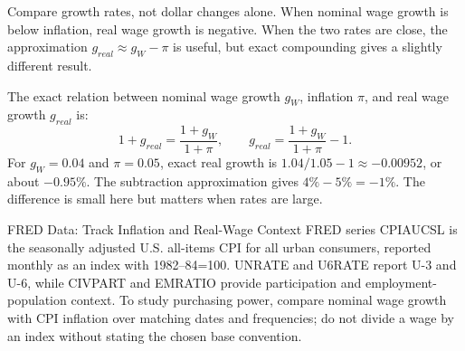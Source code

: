 \documentclass[11pt,letterpaper]{article}
\begin{document}
\begin{tcolorbox}[colback=yellow!10!white,colframe=orange!80!black,title=\textbf{Clear It Up: Nominal Raise Does Not Guarantee a Real Raise}]
Compare growth rates, not dollar changes alone. When nominal wage growth is below inflation, real wage growth is negative. When the two rates are close, the approximation $g_{real}\approx g_W-\pi$ is useful, but exact compounding gives a slightly different result.
\end{tcolorbox}

\begin{tcolorbox}[colback=blue!5!white,colframe=blue!60!black,title=\textbf{Optional Advanced: Exact Real-Wage Growth Identity}]
\small
The exact relation between nominal wage growth $g_W$, inflation $\pi$, and real wage growth $g_{real}$ is:
\[
1+g_{real}=\frac{1+g_W}{1+\pi},
\qquad
g_{real}=\frac{1+g_W}{1+\pi}-1.
\]
For $g_W=0.04$ and $\pi=0.05$, exact real growth is $1.04/1.05-1\approx-0.00952$, or about $-0.95\%$. The subtraction approximation gives $4\%-5\%=-1\%$. The difference is small here but matters when rates are large.
\end{tcolorbox}

\begin{examplecase}{FRED Data: Track Inflation and Real-Wage Context}
FRED series CPIAUCSL is the seasonally adjusted U.S. all-items CPI for all urban consumers, reported monthly as an index with 1982--84=100. UNRATE and U6RATE report U-3 and U-6, while CIVPART and EMRATIO provide participation and employment-population context. To study purchasing power, compare nominal wage growth with CPI inflation over matching dates and frequencies; do not divide a wage by an index without stating the chosen base convention.
\end{examplecase}
\end{document}
